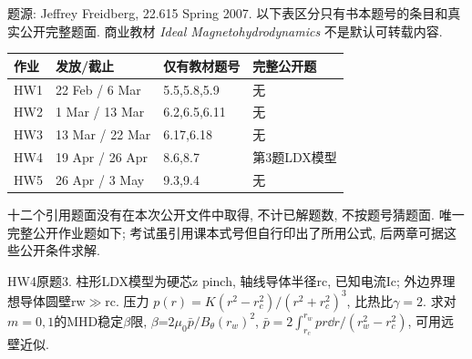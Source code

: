 题源: Jeffrey Freidberg, 22.615 Spring 2007. 以下表区分只有书本题号的条目和真实公开完整题面. 商业教材 \emph{Ideal Magnetohydrodynamics} 不是默认可转载内容.
\begin{center}\begin{tabular}{llll}\toprule 作业&发放/截止&仅有教材题号&完整公开题\\\midrule
HW1&22 Feb / 6 Mar&5.5,5.8,5.9&无\\
HW2&1 Mar / 13 Mar&6.2,6.5,6.11&无\\
HW3&13 Mar / 22 Mar&6.17,6.18&无\\
HW4&19 Apr / 26 Apr&8.6,8.7&第3题LDX模型\\
HW5&26 Apr / 3 May&9.3,9.4&无\\\bottomrule\end{tabular}\end{center}
十二个引用题面没有在本次公开文件中取得, 不计已解题数, 不按题号猜题面. 唯一完整公开作业题如下; 考试虽引用课本式号但自行印出了所用公式, 后两章可据这些公开条件求解.
\begin{exercise}\label{ex:07-hw4-3}
HW4原题3. 柱形LDX模型为硬芯z pinch, 轴线导体半径rc, 已知电流Ic; 外边界理想导体圆壁rw\ensuremath{\gg}rc. 压力 $p(r)=K(r^2-r_c^2)/(r^2+r_c^2)^3$, 比热比$\gamma=2$. 求对$m=0,1$的MHD稳定\ensuremath{\beta}限, \ensuremath{\beta}=$2\mu_0\bar p/B_\theta(r_w)^2$, $\bar p=2\int_{r_c}^{r_w}pr\dd r/(r_w^2-r_c^2)$, 可用远壁近似.
\end{exercise}
